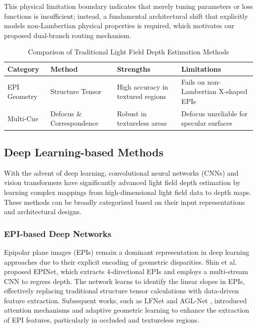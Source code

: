 This physical limitation boundary indicates that merely tuning parameters or loss functions is insufficient; instead, a fundamental architectural shift that explicitly models non-Lambertian physical properties is required, which motivates our proposed dual-branch routing mechanism.

\begin{table}[!t]
\centering
\caption{Comparison of Traditional Light Field Depth Estimation Methods}
\label{tab:traditional_methods}
\begin{tabular}{@{}llll@{}}
\toprule
\textbf{Category} & \textbf{Method} & \textbf{Strengths} & \textbf{Limitations} \\ \midrule
EPI Geometry & Structure Tensor \cite{wanner2012globally} & High accuracy in textured regions & Fails on non-Lambertian X-shaped EPIs \\
Multi-Cue & Defocus \& Correspondence \cite{tao2013depth} & Robust in textureless areas & Defocus unreliable for specular surfaces \\ \bottomrule
\end{tabular}
\end{table}

\subsection{Deep Learning-based Methods}

With the advent of deep learning, convolutional neural networks (CNNs) and vision transformers have significantly advanced light field depth estimation by learning complex mappings from high-dimensional light field data to depth maps. These methods can be broadly categorized based on their input representations and architectural designs.

\subsubsection{EPI-based Deep Networks}
Epipolar plane images (EPIs) remain a dominant representation in deep learning approaches due to their explicit encoding of geometric disparities. Shin et al.\ \cite{shin2018epinet} proposed EPINet, which extracts 4-directional EPIs and employs a multi-stream CNN to regress depth. The network learns to identify the linear slopes in EPIs, effectively replacing traditional structure tensor calculations with data-driven feature extraction. Subsequent works, such as LFNet \cite{liang2020lfnet} and AGL-Net \cite{wang2021agl}, introduced attention mechanisms and adaptive geometric learning to enhance the extraction of EPI features, particularly in occluded and textureless regions.


